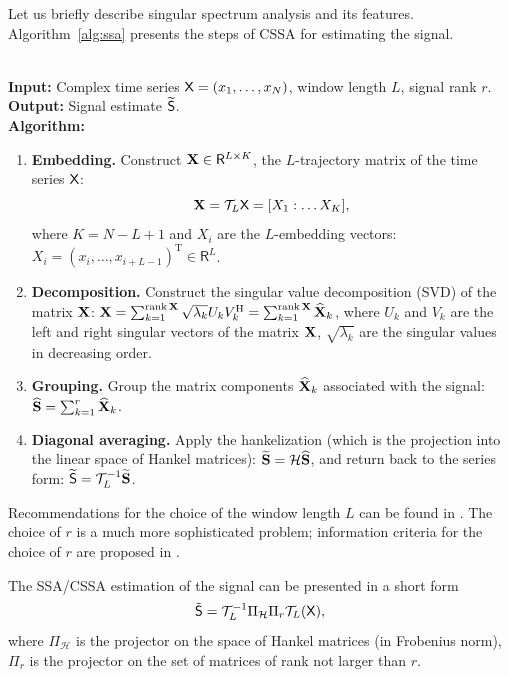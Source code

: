 \documentclass[engproc, submit, article,pdftex,moreauthors]{Definitions/mdpi}
\def\spaceR{\mathsf{R}}
\DeclareMathOperator\rank{rank}
\begin{document}
Let us briefly describe singular spectrum analysis and its features. Algorithm~\ref{alg:ssa} presents the steps of CSSA for estimating the signal.

\begin{Algorithm}
\label{alg:ssa}
~\\
\textbf{Input:} Complex time series $\textsf{X} = (x_1, \dots, x_N)$, window length $L$,
    signal rank $r$.\\
\textbf{Output:} Signal estimate $\widetilde{\textsf{S}}$.\\
\textbf{Algorithm:}
\begin{enumerate}
    \item \textbf{Embedding.}
        \label{item:embedding}
        Construct $\bfX \in \spaceR^{L \times K}$, the $L$-trajectory matrix of the time series $\textsf{X}$:
        $$\mathbf{X} = \mathcal{T}_L \textsf{X} = [X_1 : \dots X_K],$$
        where $K = N - L + 1$
        and $X_i$ are the $L$-embedding vectors:
        $X_i = (x_i, \dots, x_{i+L-1})^\mathrm{T} \in \spaceR^L$.
    \item \textbf{Decomposition.}
        \label{item:decomposition}
        Construct the singular value decomposition (SVD) of the matrix $\mathbf{X}$:
        $\bfX =
        \sum_{k=1}^{\rank \bfX} \sqrt{\lambda_k} U_k V_k^\mathrm{H} = \sum_{k=1}^{\rank \bfX} \widehat{\bfX}_k$,
        where $U_k$ and $V_k$ are the left and right singular vectors of the matrix $\mathbf{X}$,
        $\sqrt{\lambda_k}$ are the singular values in decreasing order.
    \item \textbf{Grouping.} Group the matrix components $\widehat{\mathbf{X}}_k$ associated with the signal:
        $\widehat{\mathbf{S}} = \sum_{k=1}^r \widehat{\mathbf{X}}_k$.
    \item \textbf{Diagonal averaging.}
        \label{item:reconstruction}
        Apply the hankelization (which is the projection into the linear space of Hankel matrices):
        $\widetilde{\mathbf{S}} = \mathcal{H} \widehat{\mathbf{S}}$,
        and return back to the series form:
        $\widetilde{\textsf{S}} = \mathcal{T}_L^{-1} \widetilde{\mathbf{S}}$.
\end{enumerate}
\end{Algorithm}

Recommendations for the choice of the window length $L$ can be found in \cite{Golyandina.etal2018,Golyandina2010}. The choice of $r$ is a much more sophisticated problem; information criteria for the choice of $r$ are proposed in \cite{Golyandina.Zvonarev2024}.

The SSA/CSSA estimation of the signal can be presented in a short form
	\begin{equation*}
		\tilde{\textsf{S}} = \mathcal{T}^{-1}_{L} \Pi_{\mathcal{H}} \Pi_{r} \mathcal{T}_L (\textsf{X}),
	\end{equation*}
where $\Pi_{\mathcal{H}}$ is the projector on the space of Hankel matrices (in Frobenius norm), $\Pi_{r}$ is the projector on the set of matrices of rank not larger than $r$.
\end{document}
